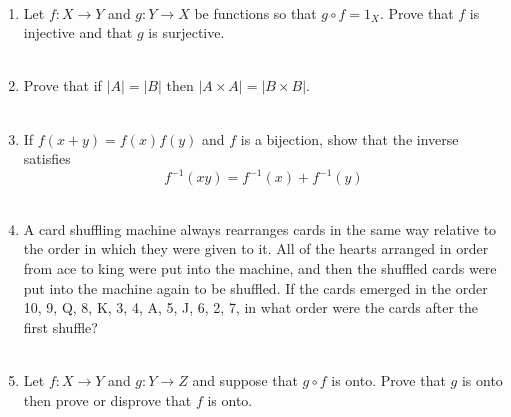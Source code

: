 \documentclass[12pt,letterpaper]{article}
\theoremstyle{plain}
\theoremstyle{definition}
\begin{document}
\ \\
\begin{enumerate}[1.]
\item Let $f:X\rightarrow Y$ and $g:Y\rightarrow X$ be functions so that $g\circ f=1_X$. Prove that $f$ is injective and that $g$ is surjective. \\
\ \\
\item Prove that if $|A|=|B|$ then $|A\times A|=|B\times B|$. \\
\ \\
\item If $f(x+y)=f(x)f(y)$ and $f$ is a bijection, show that the inverse satisfies 
\[f^{-1}(xy)=f^{-1}(x)+f^{-1}(y)\]      
\ \\
\item  A card shuffling machine always rearranges cards in the same way relative to the order in which they were given to it. All of the hearts arranged in order from ace to king were put into the machine, and then the shuffled cards were put into the machine again to be shuffled. If the cards emerged in the order 10, 9, Q, 8, K, 3, 4, A, 5, J, 6, 2, 7, in what order were the cards after the first shuffle?\\
\ \\
\item Let $f:X\rightarrow Y$ and $g:Y\rightarrow Z$ and suppose that $g\circ f$ is onto. Prove that $g$ is onto then prove or disprove that $f$ is onto. 
\end{enumerate}
\end{document}
